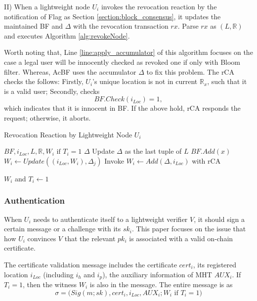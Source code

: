 \documentclass[conference]{IEEEtran}
\begin{document}
II) When a lightweight node $U_i$ invokes the revocation reaction by the notification of Flag as Section \ref{section:block_consensus}, it updates the maintained BF and $\Delta$ with the revocation transaction $rx$. Parse $rx$ as $(L, \mathbb{R})$ and executes Algorithm \ref{alg:revokeNode}.

Worth noting that, Line \ref{line:apply_accumulator} of this algorithm focuses on the case a legal user will be innocently checked as revoked one if only with Bloom filter. Whereas, AcBF uses the accumulator $\Delta$ to fix this problem. 
The rCA checks the follows: Firstly, $U_i$'s unique location is not in current $\mathbb{R}_x$, such that it is a valid user; Secondly, checks 
$$BF.Check(i_{Loc}) = 1,$$
which indicates that it is innocent in BF. If the above hold, rCA responds the request; otherwise, it aborts.

\begin{algorithm}[t]
	\renewcommand{\algorithmicensure}{\textbf{Output:}}
	\caption{Revocation Reaction by Lightweight Node $U_i$}\label{alg:revokeNode}
	\begin{algorithmic}[1]
		\Require $BF, i_{Loc}, L, \mathbb{R}, W_i \text{ if } T_i=1$
		\Ensure $\Delta$
		\State Update $\Delta$ as the last tuple of $L$
		\EndIf
		\State $BF.Add(x)$ 
		\EndFor
		\State $W_i\gets Update((i_{Loc}, W_i), \Delta_j)$ 
		\EndFor
		\State Invoke $W_i \gets Add(\Delta, i_{Loc})$ with rCA \label{line:apply_accumulator}
		
		\Return $W_i$ and $T_i \gets 1$
		\EndIf
	\end{algorithmic}
\end{algorithm}

\subsubsection{Authentication}\label{section:authentication}
When $U_i$ needs to authenticate itself to a lightweight verifier $V$, it should sign a certain message or a challenge with its $sk_i$. This paper focuses on the issue that how $U_i$ convinces $V$ that the relevant $pk_i$ is associated with a valid on-chain certificate.

The certificate validation message includes the certificate $cert_i$, its registered location $i_{Loc}$ (including $i_h$ and $i_p$), the auxiliary information of MHT $AUX_i$. If $T_i =1$, then the witness $W_i$ is also in the message. The entire message is as 
$$\sigma = \biggl(Sig(m; sk), cert_i, i_{Loc}, AUX_i; W_i \text{ if } T_i =1 \biggr)$$
\end{document}

